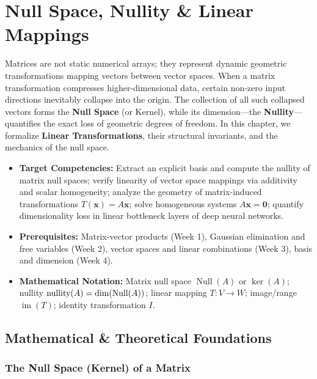 \chapter{Null Space, Nullity \& Linear Mappings}

Matrices are not static numerical arrays; they represent dynamic geometric transformations mapping vectors between vector spaces. When a matrix transformation compresses higher-dimensional data, certain non-zero input directions inevitably collapse into the origin. The collection of all such collapsed vectors forms the \textbf{Null Space} (or Kernel), while its dimension—the \textbf{Nullity}—quantifies the exact loss of geometric degrees of freedom. In this chapter, we formalize \textbf{Linear Transformations}, their structural invariants, and the mechanics of the null space.

\vspace{0.5cm}
\begin{tcolorbox}[colback=primarylight, colframe=primarydark, title={\textbf{Executive Roadmap \& Learning Objectives}}]
\begin{itemize}
    \item \textbf{Target Competencies:} Extract an explicit basis and compute the nullity of matrix null spaces; verify linearity of vector space mappings via additivity and scalar homogeneity; analyze the geometry of matrix-induced transformations $T(\mathbf{x}) = A\mathbf{x}$; solve homogeneous systems $A\mathbf{x} = \mathbf{0}$; quantify dimensionality loss in linear bottleneck layers of deep neural networks.
    \item \textbf{Prerequisites:} Matrix-vector products (Week 1), Gaussian elimination and free variables (Week 2), vector spaces and linear combinations (Week 3), basis and dimension (Week 4).
    \item \textbf{Mathematical Notation:} Matrix null space $\operatorname{Null}(A)$ or $\ker(A)$; nullity $\operatorname{nullity}(A) = \dim(\operatorname{Null}(A))$; linear mapping $T: V \to W$; image/range $\operatorname{im}(T)$; identity transformation $I$.
\end{itemize}
\end{tcolorbox}

\section{Mathematical \& Theoretical Foundations}

\subsection{The Null Space (Kernel) of a Matrix}

